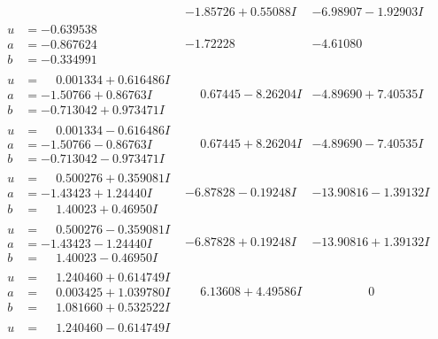 \documentclass[1p]{elsarticle_modified}
\theoremstyle{definition}
\begin{document}
$$\begin{array}{c|c|c}
 & -1.85726 + 0.55088 I & -6.98907 - 1.92903 I \\ \hline\begin{aligned}
u &= -0.639538\phantom{ +0.000000I} \\
a &= -0.867624\phantom{ +0.000000I} \\
b &= -0.334991\phantom{ +0.000000I}\end{aligned}
 & -1.72228\phantom{ +0.000000I} & -4.61080\phantom{ +0.000000I} \\ \hline\begin{aligned}
u &= \phantom{-}0.001334 + 0.616486 I \\
a &= -1.50766 + 0.86763 I \\
b &= -0.713042 + 0.973471 I\end{aligned}
 & \phantom{-}0.67445 - 8.26204 I & -4.89690 + 7.40535 I \\ \hline\begin{aligned}
u &= \phantom{-}0.001334 - 0.616486 I \\
a &= -1.50766 - 0.86763 I \\
b &= -0.713042 - 0.973471 I\end{aligned}
 & \phantom{-}0.67445 + 8.26204 I & -4.89690 - 7.40535 I \\ \hline\begin{aligned}
u &= \phantom{-}0.500276 + 0.359081 I \\
a &= -1.43423 + 1.24440 I \\
b &= \phantom{-}1.40023 + 0.46950 I\end{aligned}
 & -6.87828 - 0.19248 I & -13.90816 - 1.39132 I \\ \hline\begin{aligned}
u &= \phantom{-}0.500276 - 0.359081 I \\
a &= -1.43423 - 1.24440 I \\
b &= \phantom{-}1.40023 - 0.46950 I\end{aligned}
 & -6.87828 + 0.19248 I & -13.90816 + 1.39132 I \\ \hline\begin{aligned}
u &= \phantom{-}1.240460 + 0.614749 I \\
a &= \phantom{-}0.003425 + 1.039780 I \\
b &= \phantom{-}1.081660 + 0.532522 I\end{aligned}
 & \phantom{-}6.13608 + 4.49586 I & \phantom{-0.000000 } 0 \\ \hline\begin{aligned}
u &= \phantom{-}1.240460 - 0.614749 I \\

\end{aligned}
\end{array}$$
\end{document}
